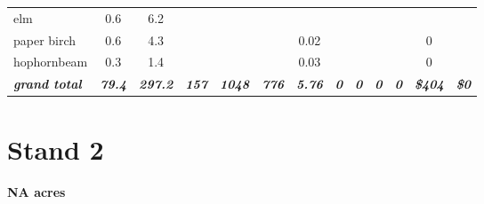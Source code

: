 \documentclass[landscape]{article}
\begin{document}
\begin{table}[H]
\begin{tabular}[t]{lcccccccccccc}
\rowcolor{gray!6}  elm & 0.6 & 6.2 &  &  &  &  &  &  &  &  &  & \\
 
paper birch & 0.6 & 4.3 &  &  &  & 0.02 &  &  &  &  & 0 & \\
 
\rowcolor{gray!6}  hophornbeam & 0.3 & 1.4 &  &  &  & 0.03 &  &  &  &  & 0 & \\
 
\rowcolor[HTML]{DCDCDC}  \em{\textbf{grand total}} & \em{\textbf{79.4}} & \em{\textbf{297.2}} & \em{\textbf{157}} & \em{\textbf{1048}} & \em{\textbf{776}} & \em{\textbf{5.76}} & \em{\textbf{0}} & \em{\textbf{0}} & \em{\textbf{0}} & \em{\textbf{0}} & \em{\textbf{\$404}} & \em{\textbf{\$0}}\\
\bottomrule
\end{tabular}
\end{table}

\pagebreak

\section{Stand 2}\label{stand-2}

\textbf{NA acres}
\end{document}
